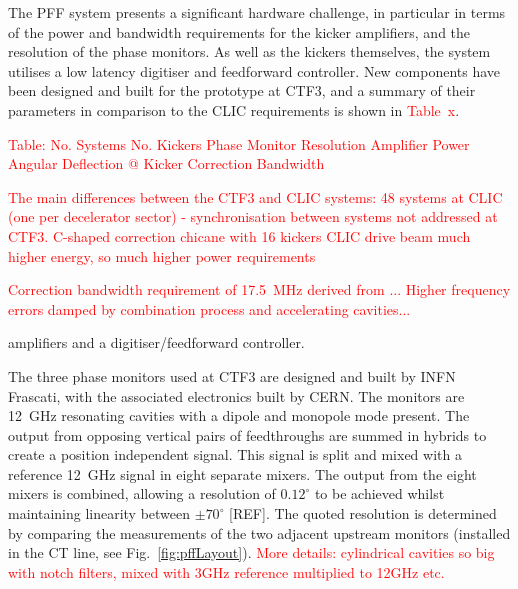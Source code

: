 \documentclass[%
 reprint,
superscriptaddress,
 amsmath,amssymb,
 prl,
]{revtex4-1}
\begin{document}


The PFF system presents a significant hardware challenge, in particular in 
terms of the power and bandwidth requirements for the kicker amplifiers, and 
the resolution of the phase monitors. As well as the kickers themselves, the 
system utilises a low latency digitiser and feedforward controller. New 
components have been designed and built for the prototype at CTF3, and a 
summary of their parameters in comparison to the CLIC requirements is shown in 
\textcolor{red}{Table~x}. 

\textcolor{red}{Table:
No. Systems
No. Kickers
Phase Monitor Resolution
Amplifier Power
Angular Deflection @ Kicker
Correction Bandwidth}

\textcolor{red}{The main differences between the CTF3 and CLIC systems:
48 systems at CLIC (one per decelerator sector) - synchronisation between 
systems not addressed at CTF3.
C-shaped correction chicane with 16 kickers
CLIC drive beam much higher energy, so much higher power requirements}

\textcolor{red}{Correction bandwidth requirement of 17.5~MHz derived from 
\cite{Gerber2015}... 
Higher frequency errors damped by combination process and accelerating 
cavities...}


amplifiers and a digitiser/feedforward controller.

The three phase monitors used at CTF3 \cite{phMonEuCard} are designed and built 
by INFN 
Frascati, with the 
associated electronics built by CERN. The monitors are 12~GHz resonating 
cavities with a dipole and monopole mode present. The output from opposing 
vertical pairs of feedthroughs are summed in hybrids to create a position 
independent signal. This signal is split and mixed with a reference 12~GHz 
signal in eight separate mixers. The output from the eight mixers is combined, 
allowing a resolution of \(0.12^\circ\) to be 
achieved whilst maintaining linearity between \(\pm70^\circ\) [REF]. The quoted 
resolution 
is determined by 
comparing the measurements of the two adjacent upstream monitors (installed in 
the CT 
line, see Fig.~\ref{fig:pffLayout}). \textcolor{red}{More details: cylindrical 
cavities so big with notch filters, mixed with 3GHz reference multiplied to 
12GHz etc.}
\end{document}
